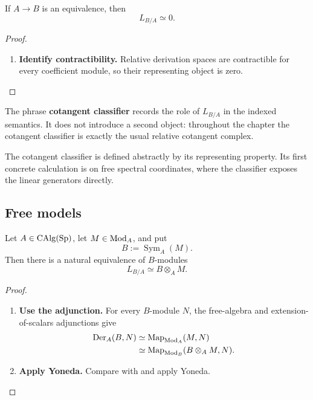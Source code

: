 \begin{corollary}
\label{cor:cotangent-equivalence-zero}
If \(A\to B\) is an equivalence, then
\[
    L_{B/A}\simeq0.
\]
\end{corollary}

\begin{proof}
\leavevmode
\begin{enumerate}[label=\textup{(\arabic*)}]
    \item \textbf{Identify contractibility.}
    Relative derivation spaces are contractible for every coefficient module, so their
    representing object is zero.
\end{enumerate}
\end{proof}

\begin{remark}
\label{rem:cotangent-classifier-terminology}
The phrase \textbf{cotangent classifier} records the role of \(L_{B/A}\) in the
indexed semantics. It does not introduce a second object: throughout the
chapter the cotangent classifier is exactly the usual relative cotangent
complex.
\end{remark}
The cotangent classifier is defined abstractly by its representing property.
Its first concrete calculation is on free spectral coordinates, where the
classifier exposes the linear generators directly.

\subsection{Free models}

\begin{proposition}
\label{prop:cotangent-free-algebra}
Let \(A\in\operatorname{CAlg}(\operatorname{Sp})\), let \(M\in\operatorname{Mod}_A\), and put
\[
    B:=\operatorname{Sym}_A(M).
\]
Then there is a natural equivalence of \(B\)-modules
\[
    L_{B/A}
    \simeq
    B\otimes_A M.
\]
\end{proposition}

\begin{proof}
\leavevmode
\begin{enumerate}[label=\textup{(\arabic*)}]
    \item \textbf{Use the adjunction.}
    For every \(B\)-module \(N\), the free-algebra and extension-of-scalars
    adjunctions give
    \[
    \begin{aligned}
        \operatorname{Der}_A(B,N)
        &\simeq
        \operatorname{Map}_{\operatorname{Mod}_A}(M,N)
        \\
        &\simeq
        \operatorname{Map}_{\operatorname{Mod}_B}(B\otimes_A M,N).
    \end{aligned}
    \]

    \item \textbf{Apply Yoneda.}
    Compare with  and apply Yoneda.
\end{enumerate}
\end{proof}

